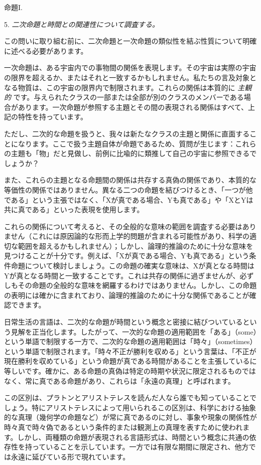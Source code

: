 \documentclass[a4paper,11pt,openany]{ltjsbook}
\begin{document}
\begin{center}
\textsc{命題I.}
\end{center}

5. \textit{二次命題と時間との関連性について調査する。}

この問いに取り組む前に、二次命題と一次命題の類似性を結ぶ性質について明確に述べる必要があります。

一次命題は、ある宇宙内での事物間の関係を表現します。その宇宙は実際の宇宙の限界を超えるか、またはそれと一致するかもしれません。私たちの言及対象となる物質は、この宇宙の限界内で制限されます。これらの関係は本質的に \textit{主観的} です。与えられたクラスの一部または全部が別のクラスのメンバーである場合があります。一次命題が参照する主題とその間の表現される関係はすべて、上記の特性を持っています。

ただし、二次的な命題を扱うと、我々は新たなクラスの主題と関係に直面することになります。ここで扱う主題自体が命題であるため、質問が生じます：これらの主題も「物」だと見做し、前例に比喩的に類推して自己の宇宙に参照できるでしょうか？

また、これらの主題となる命題間の関係は共存する真偽の関係であり、本質的な等価性の関係ではありません。異なる二つの命題を結びつけるとき、「一つが他である」という主張ではなく、「Xが真である場合、Yも真である」や「XとYは共に真である」といった表現を使用します。

これらの関係について考えると、その全般的な意味の範囲を調査する必要はありません（これには原因論的な形而上学的問題が含まれる可能性があり、科学の適切な範囲を超えるかもしれません）；しかし、論理的推論のために十分な意味を見つけることが十分です。例えば、「Xが真である場合、Yも真である」という条件命題について検討しましょう。この命題の確実な意味は、Xが真となる時間はYが真となる時間と一致することです。これは共存の関係に過ぎませんが、必ずしもその命題の全般的な意味を網羅するわけではありません。しかし、この命題の表明には確かに含まれており、論理的推論のために十分な関係であることが確認できます。

日常生活の言語は、二次的な命題が時間という概念と密接に結びついているという見解を正当化します。したがって、一次的な命題の適用範囲を「ある」（some）という単語で制限する一方で、二次的な命題の適用範囲は「時々」（sometimes）という単語で制限されます。「時々不正が勝利を収める」という言葉は、「不正が現在勝利を収めている」という命題が真である時間があることを主張しているに等しいです。確かに、ある命題の真偽は特定の時期や状況に限定されるものではなく、常に真である命題があり、これらは「永遠の真理」と呼ばれます。

この区別は、プラトンとアリストテレスを読んだ人なら誰でも知っていることでしょう。特にアリストテレスによって用いられるこの区別は、科学における抽象的な真理（幾何学の命題など）が常に真であるのに対し、事象や現象の関係性が時々真で時々偽であるという条件的または観測上の真理を表すために使われます。しかし、両種類の命題が表現される言語形式は、時間という概念に共通の依存性を持っていることを示しています。一方では有限な期間に限定され、他方では永遠に延びている形で現れています。
\end{document}
